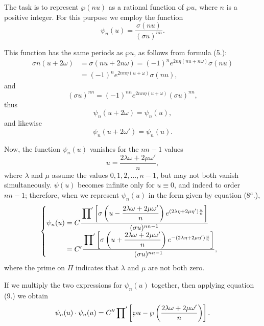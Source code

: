 \documentclass[12pt]{article}
\begin{document}
The task is to represent $\wp(nu)$ as a rational function of $\wp u$, where $n$ is a positive integer. For this purpose we employ the function
\begin{equation}
\psi_n(u) = \frac{\sigma(nu)}{(\sigma u)^{nn}}.
\end{equation}

This function has the same periods as $\wp u$, as follows from formula (5.):
\begin{align*}
\sigma n(u+2\omega) &= \sigma(nu + 2n\omega) = (-1)^n e^{2n\eta(nu+n\omega)} \sigma(nu)\\
&= (-1)^n e^{2nn\eta(u+\omega)} \sigma(nu),
\end{align*}
and
\begin{equation*}
(\sigma u)^{nn} = (-1)^{nn} e^{2nn\eta(u+\omega)} (\sigma u)^{nn},
\end{equation*}
thus
\begin{equation*}
\psi_n(u+2\omega) = \psi_n(u),
\end{equation*}
and likewise
\begin{equation*}
\psi_n(u+2\omega') = \psi_n(u).
\end{equation*}

Now, the function $\psi_n(u)$ vanishes for the $nn-1$ values
\begin{equation*}
u = \frac{2\lambda\omega + 2\mu\omega'}{n},
\end{equation*}
where $\lambda$ and $\mu$ assume the values $0, 1, 2, \dots, n-1$, but may not both vanish simultaneously. $\psi(u)$ becomes infinite only for $u \equiv 0$, and indeed to order $nn-1$; therefore, when we represent $\psi_n(u)$ in the form given by equation (8$^a$.),
\begin{equation}
\begin{cases}
\psi_n(u) = C \dfrac{\sideset{}{'}\prod \left[\sigma\left(u - \dfrac{2\lambda\omega + 2\mu\omega'}{n}\right) e^{(2\lambda\eta + 2\mu\eta')\frac{u}{n}}\right]}{(\sigma u)^{nn-1}} \\
\phantom{\psi_n(u)} = C' \dfrac{\sideset{}{'}\prod \left[\sigma\left(u + \dfrac{2\lambda\omega + 2\mu\omega'}{n}\right) e^{-(2\lambda\eta + 2\mu\eta')\frac{u}{n}}\right]}{(\sigma u)^{nn-1}},
\end{cases}
\end{equation}
where the prime on $\Pi$ indicates that $\lambda$ and $\mu$ are not both zero.

If we multiply the two expressions for $\psi_n(u)$ together, then applying equation (9.) we obtain
\begin{equation}
\psi_n(u) \cdot \psi_n(u) = C'' \sideset{}{'}\prod \left[\wp u - \wp\left(\frac{2\lambda\omega + 2\mu\omega'}{n}\right)\right].
\end{equation}
\end{document}
